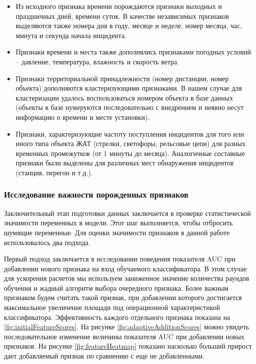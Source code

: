 \begin{itemize}
\item Из исходного признака времени порождаются признаки выходных и праздничных дней, времени суток. В качестве независимых признаков выделяются также номера дня в году, месяце и неделе, номер месяца, час, минута и секунда начала инцидента.
\item Признаки времени и места также дополнялись признаками погодных условий – давление, температура, влажность и скорость ветра.
\item Признаки территориальной принадлежности (номер дистанции, номер объекта) дополняются кластеризующими признаками. В нашем случае для кластеризации удалось воспользоваться номером объекта в базе данных (объекты в базе нумеруются последовательно с внедрением и неявно несут информацию о времени и месте установки).
\item Признаки, характеризующие частоту поступления инцидентов для того или иного типа объекта ЖАТ (стрелки, светофоры, рельсовые цепи) для разных временных промежутков (от 1 минуты до месяца). Аналогичные составные признаки были выделены для различных мест обнаружения инцидентов (станция, перегон и т.д.).
\end{itemize}

\subsubsection{Исследование важности порожденных признаков}
Заключительный этап подготовки данных заключается в проверке статистической значимости переменных в модели. Этот шаг выполняется, чтобы отбросить шумящие переменные. Для оценки значимости признаков в данной работе использовалось два подхода.

Первый подход заключается в исследовании поведения показателя AUC при добавлении нового признака на вход обучаемого классификатора. В этом случае для ускорения расчетов мы используем заниженное значение количества раундов обучения и жадный алгоритм выбора очередного признака. Более важным признаком будем считать такой признак, при добавлении которого достигается максимальное увеличение площади под операционной характеристикой классификатора. Эффективность каждого отдельного признака показана на \ref{fig:initialFeatureScores}. На рисунке \ref{fig:adaptiveAdditionScores} можно увидеть последовательное изменение величины показателя AUC при добавлении новых признаков. На рисунке \ref{fig:featureHeatmap} показано насколько больший прирост дает добавляемый признак по сравнению с еще не добавленными.

